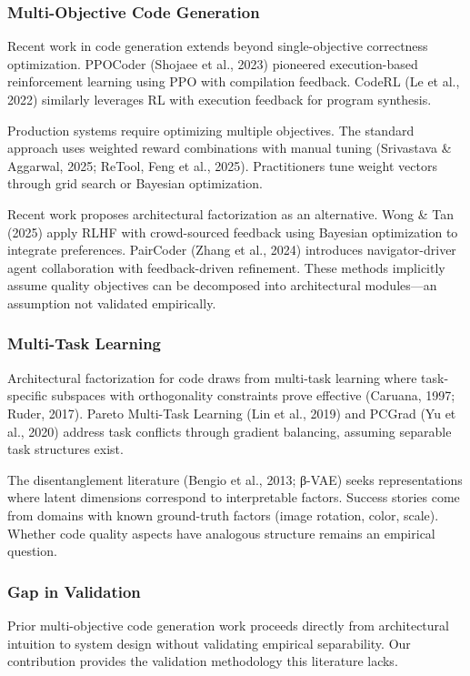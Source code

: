 
\subsubsection{Multi-Objective Code Generation}

Recent work in code generation extends beyond single-objective correctness optimization. PPOCoder (Shojaee et al., 2023) pioneered execution-based reinforcement learning using PPO with compilation feedback. CodeRL (Le et al., 2022) similarly leverages RL with execution feedback for program synthesis.

Production systems require optimizing multiple objectives. The standard approach uses weighted reward combinations with manual tuning (Srivastava \& Aggarwal, 2025; ReTool, Feng et al., 2025). Practitioners tune weight vectors through grid search or Bayesian optimization.

Recent work proposes architectural factorization as an alternative. Wong \& Tan (2025) apply RLHF with crowd-sourced feedback using Bayesian optimization to integrate preferences. PairCoder (Zhang et al., 2024) introduces navigator-driver agent collaboration with feedback-driven refinement. These methods implicitly assume quality objectives can be decomposed into architectural modules—an assumption not validated empirically.

\subsubsection{Multi-Task Learning}

Architectural factorization for code draws from multi-task learning where task-specific subspaces with orthogonality constraints prove effective (Caruana, 1997; Ruder, 2017). Pareto Multi-Task Learning (Lin et al., 2019) and PCGrad (Yu et al., 2020) address task conflicts through gradient balancing, assuming separable task structures exist.

The disentanglement literature (Bengio et al., 2013; β-VAE) seeks representations where latent dimensions correspond to interpretable factors. Success stories come from domains with known ground-truth factors (image rotation, color, scale). Whether code quality aspects have analogous structure remains an empirical question.

\subsubsection{Gap in Validation}

Prior multi-objective code generation work proceeds directly from architectural intuition to system design without validating empirical separability. Our contribution provides the validation methodology this literature lacks.
